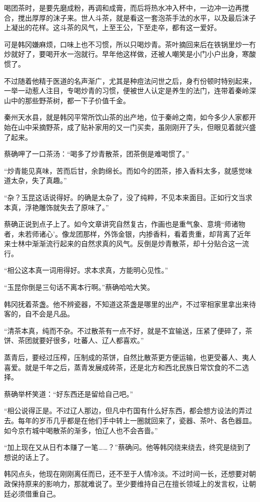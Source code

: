 喝团茶时，是要先磨成粉，再调和成膏，而后将热水冲入杯中，一边冲一边再搅合，搅出厚厚的沫子来。世人斗茶，就是看这一套泡茶手法的水平，以及最后沫子上凝出的花样。这斗茶的风气，上至王公，下至走卒，都有这一爱好。

可是韩冈嫌麻烦，口味上也不习惯，所以只喝炒青。茶叶摘回来后在铁锅里炒一冇炒就好了，要喝开水一泡就行。早年他这样做，还被人嘲笑是小门小户出身，寒酸惯了。

不过随着他精于医道的名声渐广，尤其是种痘法问世之后，身冇份顿时特别起来，一举一动惹人注目，专喝炒青的习惯，便被世人认定是养生的法门，连带着秦岭深山中的那些野茶树，都一下子价值千金。

秦州天水县，就是韩冈平常所饮山茶的出产地，位于秦岭之南，如今多少人家都开始在山中采摘野茶，成了贴补家用的又一门买卖，虽刚刚开了头，但眼见着就兴盛了起来。

蔡确呷了一口茶汤：“喝多了炒青散茶，团茶倒是难喝惯了。”

“炒青能见真味，苦而后甘，余韵绵长。而如今的团茶，掺入香料太多，就感觉味道太杂，失了真趣。”

“杂？玉昆这话说得好。的确是太杂了，没了纯粹，不见本来面目。正如行文当求本真，浮艳雕饰就失去了原味了。”

蔡确正说到点子上了。如今文章讲究自然复古，作画也是重气象、意境“师诸物者，未若师诸心’。像龙团那样，外饰金银，内掺香料，看着贵重，却背离了近年来士林中渐渐流行起来的自然求真的风气。反倒是炒青散茶，却十分贴合这一流行。

“相公这本真一词用得好。求本求真，方能明心见性。”

“玉昆你倒是三句话不离本行啊。”蔡确哈哈大笑。

韩冈抚着茶盏。他不辨瓷器，不知道这茶盏是哪里的出产，不过宰相家里拿出来待客的，自不会是凡品。

“清茶本真，纯而不杂。不过散茶有一点不好，就是不宜输送，压紧了便碎了，茶饼、茶团就要好很多，吐蕃人、辽人都喜欢。”

蒸青后，要经过压榨，压制成的茶饼，自然比散茶更方便运输，也更受蕃人、夷人喜爱。就是千年之后，蒸青发展成砖茶，还是北方和西北民族日常饮食的不二选择。

蔡确举杯笑道：“好东西还是留给自己吧。”

“相公说得正是。不过辽人那边，但凡中冇国有什么好东西，都会想方设法的弄过去。每年的岁币几乎都是在他们手中转上一圈就回来了，瓷器、茶叶、各色器皿。如今京冇城中喝散茶的渐多，怕辽人也不会吝啬。”

“加上现在又从日冇本赚了一笔……？”蔡确问。他等韩冈绕来绕去，终究是绕到了想说的话上了。

韩冈点头，他现在刚刚离任而已，还不至于人情冷淡。不过时间一长，还想要对朝政保持原来的影响力，那就难说了。至少要维持自己在擅长领域上的发言权，让朝廷必须借重自己。

